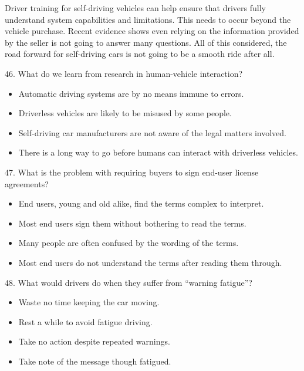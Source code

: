\documentclass[UTF8,11pt]{ctexart}
\begin{document}
Driver training for self-driving vehicles can help ensure that drivers fully understand system capabilities and limitations. This needs to occur beyond the vehicle purchase. Recent evidence shows even relying on the information provided by the seller is not going to answer many questions. All of this considered, the road forward for self-driving cars is not going to be a smooth ride after all.


46. What do we learn from research in human-vehicle interaction?


\begin{itemize}[leftmargin=2em,itemsep=.2em,topsep=.4em]\item[A.] Automatic driving systems are by no means immune to errors.
\item[B.] Driverless vehicles are likely to be misused by some people.
\item[C.] Self-driving car manufacturers are not aware of the legal matters involved.
\item[D.] There is a long way to go before humans can interact with driverless vehicles.
\end{itemize}

47. What is the problem with requiring buyers to sign end-user license agreements?


\begin{itemize}[leftmargin=2em,itemsep=.2em,topsep=.4em]\item[A.] End users, young and old alike, find the terms complex to interpret.
\item[B.] Most end users sign them without bothering to read the terms.
\item[C.] Many people are often confused by the wording of the terms.
\item[D.] Most end users do not understand the terms after reading them through.
\end{itemize}

48. What would drivers do when they suffer from “warning fatigue”?


\begin{itemize}[leftmargin=2em,itemsep=.2em,topsep=.4em]\item[A.] Waste no time keeping the car moving.
\item[B.] Rest a while to avoid fatigue driving.
\item[C.] Take no action despite repeated warnings.
\item[D.] Take note of the message though fatigued.
\end{itemize}
\end{document}
